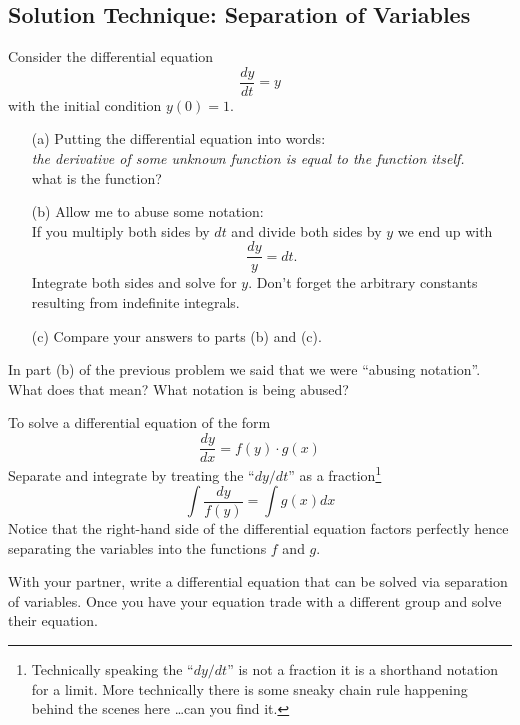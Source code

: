 \subsection{Solution Technique: Separation of Variables}
\begin{problem}
    Consider the differential equation 
    \[ \frac{dy}{dt} = y \]
    with the initial condition $y(0) = 1$.
    \begin{enumerate}
        \item[(a)] Putting the differential equation into words: \\ {\it the derivative of
            some unknown function is equal to the function itself.} \\
            what is the function?
        \item[(b)] Allow me to abuse some notation: \\
            If you multiply both sides by $dt$ and divide both sides by $y$ we end up with
            \[ \frac{dy}{y} = dt. \]
            Integrate both sides and solve for $y$. Don't forget the arbitrary constants
            resulting from indefinite integrals.
        \item[(c)] Compare your answers to parts (b) and (c).
    \end{enumerate}
\end{problem}

\begin{problem}
    In part (b) of the previous problem we said that we were ``abusing notation''.  What does
    that mean?  What notation is being abused?
\end{problem}

\begin{technique}
    To solve a differential equation of the form
    \[ \frac{dy}{dx} = f(y)\cdot g(x) \]
    Separate and integrate by treating the ``$dy/dt$'' as a fraction\footnote{Technically
        speaking the ``$dy/dt$'' is not a fraction it is a shorthand notation for a
    limit.  More technically there is some sneaky chain rule happening behind the scenes
here \ldots can you find it.}
    \[ \int \frac{dy}{f(y)} = \int g(x) dx \]
    Notice that the right-hand side of the differential equation factors perfectly hence
    separating the variables into the functions $f$ and $g$.
\end{technique}

\begin{problem}
    With your partner, write a differential equation that can be solved via separation of
    variables.  Once you have your equation trade with a different group and solve their
    equation.
\end{problem}

